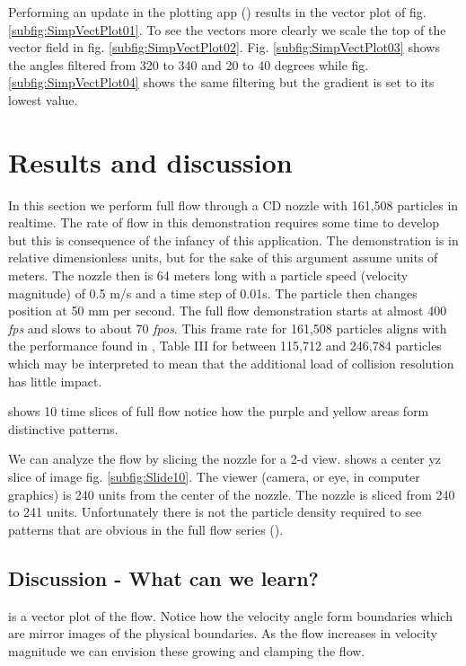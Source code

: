 Performing an update in the plotting app () results in the vector plot of fig. \ref{subfig:SimpVectPlot01}. To see the vectors more clearly we scale the top of the vector field in fig. \ref{subfig:SimpVectPlot02}. Fig. \ref{subfig:SimpVectPlot03} shows the angles filtered from 320 to 340 and 20 to 40 degrees while fig. \ref{subfig:SimpVectPlot04} shows the same filtering but the gradient is set to its lowest value.

\section{Results and discussion}

In this section we perform full flow through a CD nozzle with 161,508 particles in realtime. The rate of flow in this demonstration requires some time to develop but this is consequence of the infancy of this application. The demonstration is in relative dimensionless units, but for the sake of this argument assume units of meters. The nozzle then is 64 meters long with a particle speed (velocity magnitude) of 0.5 m/s and a time step of 0.01s. The particle then changes position at 50 mm per second. The full flow demonstration starts at almost 400 \textit{fps} and slows to about 70 \textit{fpos}. This frame rate for 161,508 particles aligns with the performance found in \citep{bell2024MST}, Table III for between 115,712 and 246,784 particles which may be interpreted to mean that the additional load of collision resolution has little impact.

 shows 10 time slices of full flow notice how the purple and yellow areas form distinctive patterns.


We can analyze the flow by slicing the nozzle for a 2-d view.  shows a center yz slice of image fig. \ref{subfig:Slide10}. The viewer (camera, or eye, in computer graphics) is 240 units from the center of the nozzle. The nozzle is sliced from 240 to 241 units. Unfortunately there is not the particle density required to see patterns that are obvious in the full flow series (). 



\subsection{Discussion - What can we learn?}

 is a vector plot of the flow. Notice how the velocity angle form boundaries which are mirror images of the physical boundaries. As the flow increases in velocity magnitude we can envision these growing and clamping the flow.


